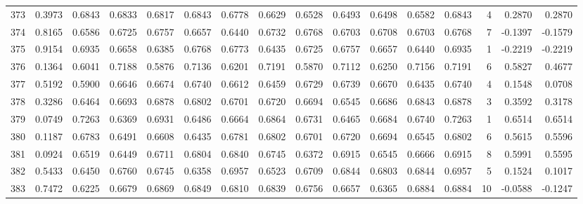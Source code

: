 \begin{tabular}{lrrrrrrrrrrrrrrr}
373 &      0.3973 &  0.6843 &  0.6833 &  0.6817 &  0.6843 &  0.6778 &  0.6629 &  0.6528 &  0.6493 &  0.6498 &   0.6582 &     0.6843 &      4 &                    0.2870 &                     0.2870 \\
374 &      0.8165 &  0.6586 &  0.6725 &  0.6757 &  0.6657 &  0.6440 &  0.6732 &  0.6768 &  0.6703 &  0.6708 &   0.6703 &     0.6768 &      7 &                   -0.1397 &                    -0.1579 \\
375 &      0.9154 &  0.6935 &  0.6658 &  0.6385 &  0.6768 &  0.6773 &  0.6435 &  0.6725 &  0.6757 &  0.6657 &   0.6440 &     0.6935 &      1 &                   -0.2219 &                    -0.2219 \\
376 &      0.1364 &  0.6041 &  0.7188 &  0.5876 &  0.7136 &  0.6201 &  0.7191 &  0.5870 &  0.7112 &  0.6250 &   0.7156 &     0.7191 &      6 &                    0.5827 &                     0.4677 \\
377 &      0.5192 &  0.5900 &  0.6646 &  0.6674 &  0.6740 &  0.6612 &  0.6459 &  0.6729 &  0.6739 &  0.6670 &   0.6435 &     0.6740 &      4 &                    0.1548 &                     0.0708 \\
378 &      0.3286 &  0.6464 &  0.6693 &  0.6878 &  0.6802 &  0.6701 &  0.6720 &  0.6694 &  0.6545 &  0.6686 &   0.6843 &     0.6878 &      3 &                    0.3592 &                     0.3178 \\
379 &      0.0749 &  0.7263 &  0.6369 &  0.6931 &  0.6486 &  0.6664 &  0.6864 &  0.6731 &  0.6465 &  0.6684 &   0.6740 &     0.7263 &      1 &                    0.6514 &                     0.6514 \\
380 &      0.1187 &  0.6783 &  0.6491 &  0.6608 &  0.6435 &  0.6781 &  0.6802 &  0.6701 &  0.6720 &  0.6694 &   0.6545 &     0.6802 &      6 &                    0.5615 &                     0.5596 \\
381 &      0.0924 &  0.6519 &  0.6449 &  0.6711 &  0.6804 &  0.6840 &  0.6745 &  0.6372 &  0.6915 &  0.6545 &   0.6666 &     0.6915 &      8 &                    0.5991 &                     0.5595 \\
382 &      0.5433 &  0.6450 &  0.6760 &  0.6745 &  0.6358 &  0.6957 &  0.6523 &  0.6709 &  0.6844 &  0.6803 &   0.6844 &     0.6957 &      5 &                    0.1524 &                     0.1017 \\
383 &      0.7472 &  0.6225 &  0.6679 &  0.6869 &  0.6849 &  0.6810 &  0.6839 &  0.6756 &  0.6657 &  0.6365 &   0.6884 &     0.6884 &     10 &                   -0.0588 &                    -0.1247 \\

\end{tabular}
